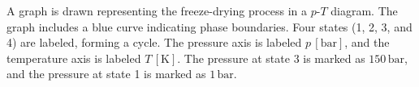 A graph is drawn representing the freeze-drying process in a \( p \)-\( T \) diagram. The graph includes a blue curve indicating phase boundaries. Four states (1, 2, 3, and 4) are labeled, forming a cycle. The pressure axis is labeled \( p \, [\text{bar}] \), and the temperature axis is labeled \( T \, [\text{K}] \). The pressure at state 3 is marked as \( 150 \, \text{bar} \), and the pressure at state 1 is marked as \( 1 \, \text{bar} \).